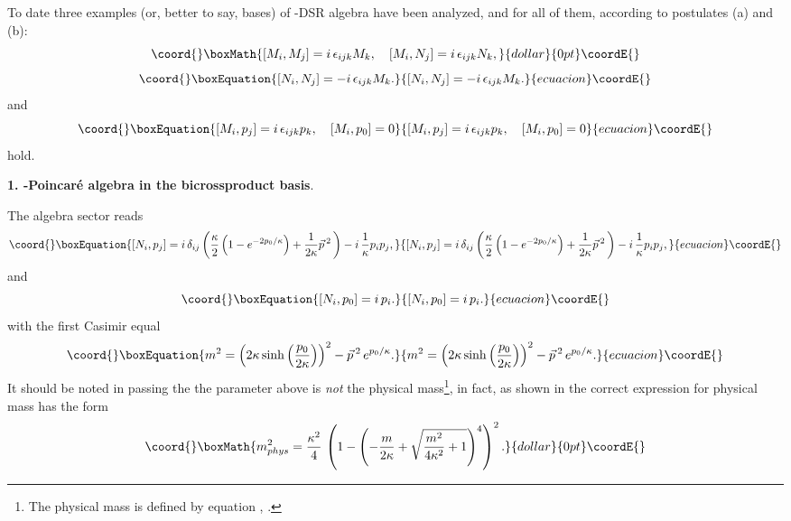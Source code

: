 \documentclass [prd,twocolumn,nofootinbib,showpacs]  {revtex4}
\begin{document}
To date three examples (or, better to say, bases) of \myHighlight{$\kappa$}\coordHE{}-DSR
algebra have been analyzed, and for all of them, according to
postulates (a) and (b):
$$\coord{}\boxMath{
[M_i, M_j] = i\, \epsilon_{ijk} M_k, \quad [M_i, N_j] = i\, \epsilon_{ijk} N_k,
}{dollar}{0pt}\coordE{}$$
\begin{equation}\coord{}\boxEquation{\label{1}
  [N_i, N_j] = -i\, \epsilon_{ijk} M_k.
}{[N_i, N_j] = -i\, \epsilon_{ijk} M_k.
}{ecuacion}\coordE{}\end{equation}
and
\begin{equation}\coord{}\boxEquation{\label{2}
  [M_i, p_j] = i\, \epsilon_{ijk} p_k, \quad [M_i, p_0] =0
}{[M_i, p_j] = i\, \epsilon_{ijk} p_k, \quad [M_i, p_0] =0
}{ecuacion}\coordE{}\end{equation}
hold.
\newline

\noindent
{\bf 1. \myHighlight{$\kappa$}\coordHE{}-Poincar\'e algebra in the bicrossproduct basis}.
\newline

The algebra sector reads
\begin{equation}\coord{}\boxEquation{\label{3}
   \left[N_{i}, p_{j}\right] = i\,  \delta_{ij}
 \left( {\kappa\over 2} \left(
 1 -e^{-2{p_{0}/ \kappa}}
\right) + {1\over 2\kappa} \vec{p}\,{}^{ 2}\, \right) - i\,
{1\over \kappa} p_{i}p_{j} ,
}{\left[N_{i}, p_{j}\right] = i\,  \delta_{ij}
 \left( {\kappa\over 2} \left(
 1 -e^{-2{p_{0}/ \kappa}}
\right) + {1\over 2\kappa} \vec{p}\,{}^{ 2}\, \right) - i\,
{1\over \kappa} p_{i}p_{j} ,
}{ecuacion}\coordE{}\end{equation}
and
\begin{equation}\coord{}\boxEquation{\label{4}
  \left[N_{i},p_{0}\right] = i\, p_{i}.
}{\left[N_{i},p_{0}\right] = i\, p_{i}.
}{ecuacion}\coordE{}\end{equation}
with the first Casimir equal
\begin{equation}\coord{}\boxEquation{\label{5}
 m^2 = \left(2\kappa \sinh \left(\frac{p_0}{2\kappa}\right)\right)^2 - \vec{p}\,{}^2\, e^{p_0/\kappa}.
}{m^2 = \left(2\kappa \sinh \left(\frac{p_0}{2\kappa}\right)\right)^2 - \vec{p}\,{}^2\, e^{p_0/\kappa}.
}{ecuacion}\coordE{}\end{equation}
It should be noted in passing the the parameter \coordHE{} above is {\em
not} the  physical mass\footnote{The physical mass is defined by
equation
\coordHE{},
\coordHE{}. }, in fact, as shown in \cite{juse} the correct
expression for physical mass has the form
$$\coord{}\boxMath{
{m^2_{phys}}=\frac{\kappa^2}{4}\, \left(1-\left(-\frac{m}{2\kappa} +
\sqrt{\frac{m^2}{4\kappa^2} +1}\right)^4\right)^2.
}{dollar}{0pt}\coordE{}$$
\end{document}
